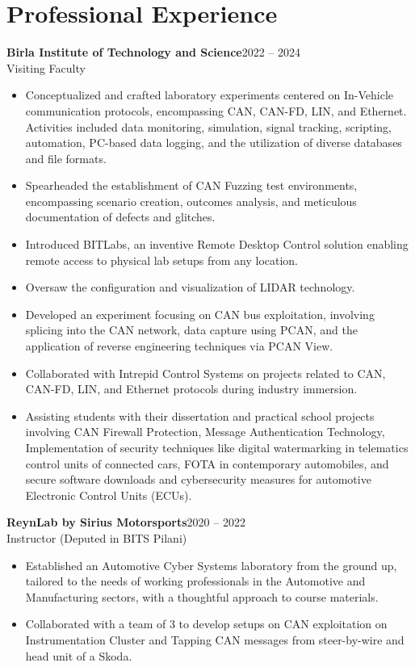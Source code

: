 \documentclass[a4paper,11pt]{article}
\begin{document}
\section*{Professional Experience}
\noindent
\textbf{Birla Institute of Technology and Science}\hfill 2022 -- 2024 \\
Visiting Faculty
\begin{itemize}
    \item Conceptualized and crafted laboratory experiments centered on In-Vehicle communication protocols, encompassing CAN, CAN-FD, LIN, and Ethernet. Activities included data monitoring, simulation, signal tracking, scripting, automation, PC-based data logging, and the utilization of diverse databases and file formats.
    \item Spearheaded the establishment of CAN Fuzzing test environments, encompassing scenario creation, outcomes analysis, and meticulous documentation of defects and glitches.
    \item Introduced BITLabs, an inventive Remote Desktop Control solution enabling remote access to physical lab setups from any location.
    \item Oversaw the configuration and visualization of LIDAR technology.
    \item Developed an experiment focusing on CAN bus exploitation, involving splicing into the CAN network, data capture using PCAN, and the application of reverse engineering techniques via PCAN View.
    \item Collaborated with Intrepid Control Systems on projects related to CAN, CAN-FD, LIN, and Ethernet protocols during industry immersion.
    \item Assisting students with their dissertation and practical school projects involving CAN Firewall Protection, Message Authentication Technology, Implementation of security techniques like digital watermarking in telematics control units of connected cars, FOTA in contemporary automobiles, and secure software downloads and cybersecurity measures for automotive Electronic Control Units (ECUs).
\end{itemize}
\vspace{4pt}
\noindent
\textbf{ReynLab by Sirius Motorsports}\hfill 2020 -- 2022 \\
Instructor (Deputed in BITS Pilani)
\begin{itemize}
    \item Established an Automotive Cyber Systems laboratory from the ground up, tailored to the needs of working professionals in the Automotive and Manufacturing sectors, with a thoughtful approach to course materials.
    \item Collaborated with a team of 3 to develop setups on CAN exploitation on Instrumentation Cluster and Tapping CAN messages from steer-by-wire and head unit of a Skoda.
\end{itemize}
\end{document}
